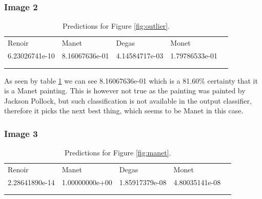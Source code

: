 \subsubsection*{Image 2}

\begin{table}[H]
    \centering
    \caption{Predictions for Figure \ref{fig:outlier}.}
    \label{tbl:outlier_predictions}
    \begin{tabular}{lllll}
    \cline{1-4}
    \multicolumn{1}{|l|}{Renoir}         & \multicolumn{1}{l|}{Manet}          & \multicolumn{1}{l|}{Degas}          & \multicolumn{1}{l|}{Monet}          &  \\ \cline{1-4}
    \multicolumn{1}{|l|}{6.23026741e-10} & \multicolumn{1}{l|}{8.16067636e-01} & \multicolumn{1}{l|}{4.14584717e-03} & \multicolumn{1}{l|}{1.79786533e-01} &  \\ \cline{1-4}
                                         &                                     &                                     &                                     &  \\
                                         &                                     &                                     &                                     & 
    \end{tabular}
\end{table}

As seen by table \ref{tbl:outlier_predictions} we can see 8.16067636e-01 which is a 81.60\% certainty that it is a Manet painting. This is however not true as the painting was painted by Jackson Pollock, but such classification is not available in the output classifier, therefore it picks the next best thing, which seems to be Manet in this case. 


\subsubsection*{Image 3}

\begin{table}[H]
    \centering
    \caption{Predictions for Figure \ref{fig:manet}.}
    \label{tbl:manet_predictions}
    \begin{tabular}{lllll}
    \cline{1-4}
    \multicolumn{1}{|l|}{Renoir}         & \multicolumn{1}{l|}{Manet}          & \multicolumn{1}{l|}{Degas}          & \multicolumn{1}{l|}{Monet}          &  \\ \cline{1-4}
    \multicolumn{1}{|l|}{2.28641890e-14} & \multicolumn{1}{l|}{1.00000000e+00} & \multicolumn{1}{l|}{1.85917379e-08} & \multicolumn{1}{l|}{4.80035141e-08} &  \\ \cline{1-4}
                                         &                                     &                                     &                                     &  \\
                                         &                                     &                                     &                                     & 
    \end{tabular}
\end{table}

